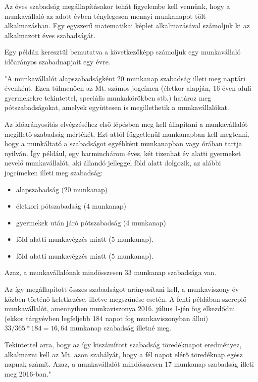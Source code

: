 Az éves szabadság megállapításakor tehát figyelembe kell vennünk, hogy a munkavállaló az adott évben ténylegesen mennyi munkanapot tölt alkalmazásban. Egy egyszerű matematikai képlet alkalmazásával számoljuk ki az alkalmazott éves szabadságát. 

Egy példán keresztül bemutatva a következőképp számoljuk egy munkavállaló időarányos szabadnapjait egy évre.

"A munkavállalót alapszabadságként 20 munkanap szabadság illeti meg naptári évenként. Ezen túlmenően az Mt. számos jogcímen (életkor alapján, 16 éven aluli gyermekekre tekintettel, speciális munkakörökben stb.) határoz meg pótszabadságokat, amelyek együttesen is megillethetik a munkavállalókat.

Az időarányosítás elvégzéséhez első lépésben meg kell állapítani a munkavállalót megillető szabadság mértékét. Ezt attól függetlenül munkanapban kell megtenni, hogy a munkáltató a szabadságot egyébként munkanapban vagy órában tartja nyilván.  Így például, egy harminchárom éves, két tizenhat év alatti gyermeket nevelő munkavállalót, aki állandó jelleggel föld alatt dolgozik, az alábbi jogcímeken illeti meg szabadság:

\begin{itemize}
	\item alapszabadság (20 munkanap)
	\item életkori pótszabadság (4 munkanap)
	\item gyermekek után járó pótszabadság (4 munkanap)
	\item föld alatti munkavégzés miatt (5 munkanap).
	\item föld alatti munkavégzés miatt (5 munkanap).
\end{itemize}

Azaz, a munkavállalónak mindösszesen 33 munkanap szabadsága van.

Az így megállapított összes szabadságot arányosítani kell, a munkaviszony év közben történő keletkezése, illetve megszűnése esetén. A fenti példában szereplő munkavállalót, amennyiben munkaviszonya 2016. július 1-jén fog elkezdődni (ekkor tárgyévben legfeljebb 184 napot fog munkaviszonyban állni) \( 33/365*184= 16,64 \) munkanap szabadság illetné meg.

Tekintettel arra, hogy az így kiszámított szabadság töredéknapot eredményez, alkalmazni kell az Mt. azon szabályát, hogy a fél napot elérő töredéknap egész napnak számít. Azaz, a munkavállalót mindösszesen 17 munkanap szabadság illeti meg 2016-ban."\cite{idoranyosSzamolasPelda}

